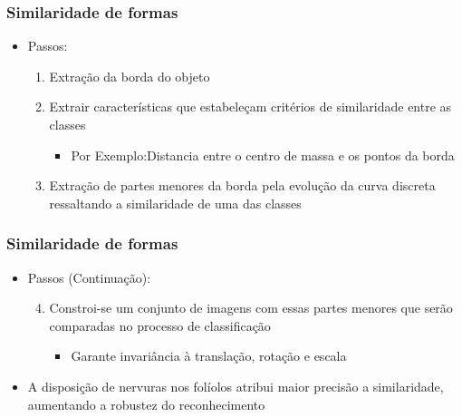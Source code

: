 \documentclass[brazil,a4paper,12pt]{beamer}%
\begin{document}
    \begin{frame}
     \frametitle{Similaridade de formas}
      \begin{itemize}
       \item{Passos:
	   \begin{enumerate}
		\item{Extração da borda do objeto}
		\item{Extrair características que estabeleçam critérios de similaridade entre as classes
		  \begin{itemize}
		   \item{Por Exemplo:Distancia entre o centro de massa e os pontos da borda} 
		  \end{itemize}
		}
		\item{Extração de partes menores da borda pela evolução da curva discreta ressaltando a similaridade de uma das classes}
	  \end{enumerate}	}
      \end{itemize}
    \end{frame}

    \begin{frame}
     \frametitle{Similaridade de formas}
      \begin{itemize}
       \item{Passos (Continuação):
	\begin{enumerate}
	  \setcounter{enumi}{3}
		\item{Constroi-se um conjunto de imagens com essas partes menores que serão comparadas no processo de classificação
		  \begin{itemize}
		    \item{Garante invariância à translação, rotação e escala} 
		  \end{itemize}
		}
	\end{enumerate}
       }
       \item{A disposição de nervuras nos folíolos atribui maior precisão a similaridade, aumentando a robustez do reconhecimento}
      \end{itemize}
    \end{frame}
\end{document}
